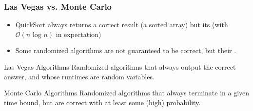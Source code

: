 \documentclass[aspectratio=169]{beamer}
\begin{document}
\begin{frame}\frametitle{Las Vegas vs. Monte Carlo}

\begin{itemize}
  \item QuickSort always returns a \alert{correct result} (a sorted array) but its  (with $\mathcal{O}(n\text{ log }n)$ in expectation)
  \item Some randomized algorithms are \alert{not guaranteed to be correct}, but their .
\end{itemize}

\begin{block}{Las Vegas Algorithms}
Randomized algorithms that always output the correct answer, and whose runtimes are random variables.
\end{block}

\begin{alertblock}{Monte Carlo Algorithms}
Randomized algorithms that always terminate in a given time bound, but are correct with at least some (high) probability.
\end{alertblock}

\end{frame}


  


\end{document}
